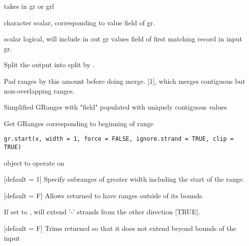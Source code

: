 \documentclass[a4paper]{book}
\begin{document}
%
\begin{Arguments}
\begin{ldescription}
\item[\code{gr}] takes in gr or grl

\item[\code{field}] character scalar, corresponding to value field of gr. \code{[NULL]}

\item[\code{val}] \code{[NULL]}

\item[\code{include.val}] scalar logical, will include in out gr values field of first matching record in input gr. \code{[TRUE]}

\item[\code{split}] Split the output into  split by . \code{[FALSE]}

\item[\code{pad}] Pad ranges by this amount before doing merge. [1], which merges contiguous but non-overlapping ranges.
\end{ldescription}
\end{Arguments}
%
\begin{Value}
Simplified GRanges with "field" populated with uniquely contiguous values
\end{Value}
%
\begin{Description}\relax
Get GRanges corresponding to beginning of range
\end{Description}
%
\begin{Usage}
\begin{verbatim}
gr.start(x, width = 1, force = FALSE, ignore.strand = TRUE, clip = TRUE)
\end{verbatim}
\end{Usage}
%
\begin{Arguments}
\begin{ldescription}
\item[\code{x}]  object to operate on

\item[\code{width}] [default = 1] Specify subranges of greater width including the start of the range.

\item[\code{force}] [default = F] Allows returned  to have ranges outside of its  bounds.

\item[\code{ignore.strand}] If set to , will extend '-' strands from the other direction [TRUE].

\item[\code{clip}] [default = F] Trims returned  so that it does not extend beyond bounds of the input 
\end{ldescription}
\end{Arguments}
\end{document}
